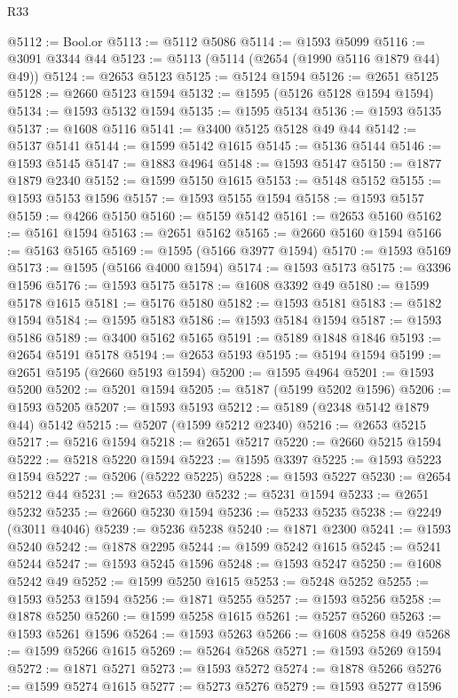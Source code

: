 \begin{lexlean}{R33}
\begin{coremodule}
@5112 := Bool.or
@5113 := @5112 @5086
@5114 := @1593 @5099
@5116 := @3091 @3344 @44
@5123 := @5113 (@5114 (@2654 (@1990 @5116 @1879 @44) @49))
@5124 := @2653 @5123
@5125 := @5124 @1594
@5126 := @2651 @5125
@5128 := @2660 @5123 @1594
@5132 := @1595 (@5126 @5128 @1594 @1594)
@5134 := @1593 @5132 @1594
@5135 := @1595 @5134
@5136 := @1593 @5135
@5137 := @1608 @5116
@5141 := @3400 @5125 @5128 @49 @44
@5142 := @5137 @5141
@5144 := @1599 @5142 @1615
@5145 := @5136 @5144
@5146 := @1593 @5145
@5147 := @1883 @4964
@5148 := @1593 @5147
@5150 := @1877 @1879 @2340
@5152 := @1599 @5150 @1615
@5153 := @5148 @5152
@5155 := @1593 @5153 @1596
@5157 := @1593 @5155 @1594
@5158 := @1593 @5157
@5159 := @4266 @5150
@5160 := @5159 @5142
@5161 := @2653 @5160
@5162 := @5161 @1594
@5163 := @2651 @5162
@5165 := @2660 @5160 @1594
@5166 := @5163 @5165
@5169 := @1595 (@5166 @3977 @1594)
@5170 := @1593 @5169
@5173 := @1595 (@5166 @4000 @1594)
@5174 := @1593 @5173
@5175 := @3396 @1596
@5176 := @1593 @5175
@5178 := @1608 @3392 @49
@5180 := @1599 @5178 @1615
@5181 := @5176 @5180
@5182 := @1593 @5181
@5183 := @5182 @1594
@5184 := @1595 @5183
@5186 := @1593 @5184 @1594
@5187 := @1593 @5186
@5189 := @3400 @5162 @5165
@5191 := @5189 @1848 @1846
@5193 := @2654 @5191 @5178
@5194 := @2653 @5193
@5195 := @5194 @1594
@5199 := @2651 @5195 (@2660 @5193 @1594)
@5200 := @1595 @4964
@5201 := @1593 @5200
@5202 := @5201 @1594
@5205 := @5187 (@5199 @5202 @1596)
@5206 := @1593 @5205
@5207 := @1593 @5193
@5212 := @5189 (@2348 @5142 @1879 @44) @5142
@5215 := @5207 (@1599 @5212 @2340)
@5216 := @2653 @5215
@5217 := @5216 @1594
@5218 := @2651 @5217
@5220 := @2660 @5215 @1594
@5222 := @5218 @5220 @1594
@5223 := @1595 @3397
@5225 := @1593 @5223 @1594
@5227 := @5206 (@5222 @5225)
@5228 := @1593 @5227
@5230 := @2654 @5212 @44
@5231 := @2653 @5230
@5232 := @5231 @1594
@5233 := @2651 @5232
@5235 := @2660 @5230 @1594
@5236 := @5233 @5235
@5238 := @2249 (@3011 @4046)
@5239 := @5236 @5238
@5240 := @1871 @2300
@5241 := @1593 @5240
@5242 := @1878 @2295
@5244 := @1599 @5242 @1615
@5245 := @5241 @5244
@5247 := @1593 @5245 @1596
@5248 := @1593 @5247
@5250 := @1608 @5242 @49
@5252 := @1599 @5250 @1615
@5253 := @5248 @5252
@5255 := @1593 @5253 @1594
@5256 := @1871 @5255
@5257 := @1593 @5256
@5258 := @1878 @5250
@5260 := @1599 @5258 @1615
@5261 := @5257 @5260
@5263 := @1593 @5261 @1596
@5264 := @1593 @5263
@5266 := @1608 @5258 @49
@5268 := @1599 @5266 @1615
@5269 := @5264 @5268
@5271 := @1593 @5269 @1594
@5272 := @1871 @5271
@5273 := @1593 @5272
@5274 := @1878 @5266
@5276 := @1599 @5274 @1615
@5277 := @5273 @5276
@5279 := @1593 @5277 @1596

\end{coremodule}
\end{lexlean}
